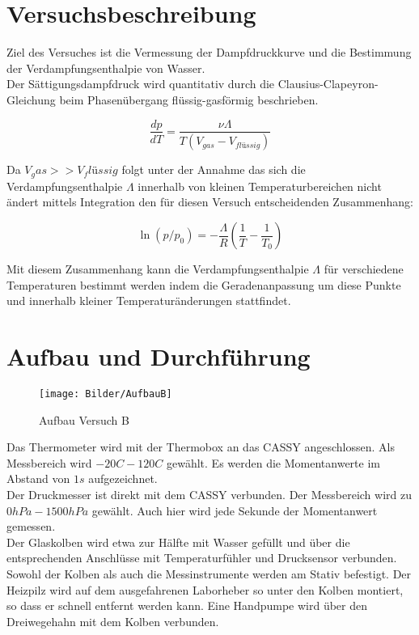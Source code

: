 \documentclass[12pt,a4paper]{article}
\author{Tim}
\begin{document}
\newpage
\tableofcontents
\newpage

\section{Versuchsbeschreibung}
Ziel des Versuches ist die Vermessung der Dampfdruckkurve und die Bestimmung der Verdampfungsenthalpie von Wasser.\\

Der Sättigungsdampfdruck wird quantitativ durch die Clausius-Clapeyron-Gleichung beim Phasenübergang flüssig-gasförmig beschrieben.

\begin{equation}
	\frac{dp}{dT}=\frac{\nu \Lambda}{T(V_{gas}-				V_{flüssig})}
\end{equation}

Da $V_gas >> V_flüssig$ folgt unter der Annahme das sich die Verdampfungsenthalpie $\Lambda$ innerhalb von kleinen Temperaturbereichen nicht ändert mittels Integration den für diesen Versuch entscheidenden Zusammenhang:

\begin{equation}
	\ln{(p/p_0)}=-\frac{\Lambda}{R} (\frac{1}{T}-			\frac{1}{T_0})
\end{equation}

Mit diesem Zusammenhang kann die Verdampfungsenthalpie $\Lambda$ für verschiedene Temperaturen bestimmt werden indem die Geradenanpassung um diese Punkte und innerhalb kleiner Temperaturänderungen stattfindet.

\section{Aufbau und Durchführung}
\begin{figure}
\texttt{[image: Bilder/AufbauB]}
\caption[AufbauB]{Aufbau Versuch B}
\label{fig:AufbauB}
\end{figure}

Das Thermometer wird mit der Thermobox an das CASSY angeschlossen. Als Messbereich wird $-20C-120C$ gewählt. Es werden die Momentanwerte im Abstand von $1s$ aufgezeichnet.\\
Der Druckmesser ist direkt mit dem CASSY verbunden. Der Messbereich wird zu $0hPa-1500hPa$ gewählt. Auch hier wird jede Sekunde der Momentanwert gemessen.\\

Der Glaskolben wird etwa zur Hälfte mit Wasser gefüllt und über die entsprechenden Anschlüsse mit Temperaturfühler und Drucksensor verbunden. Sowohl der Kolben als auch die Messinstrumente werden am Stativ befestigt. Der Heizpilz wird auf dem ausgefahrenen Laborheber so unter den Kolben montiert, so dass er schnell entfernt werden kann. Eine Handpumpe wird über den Dreiwegehahn mit dem Kolben verbunden.\\
\end{document}
